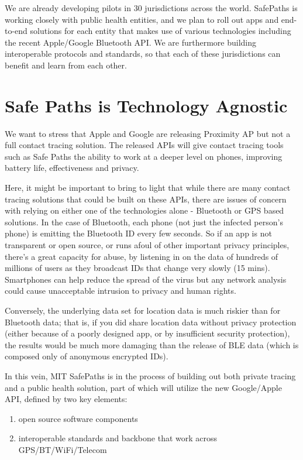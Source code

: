 \documentclass[11pt]{article}
\begin{document}
We are already developing pilots in 30 jurisdictions across the world.  SafePaths is working closely with public health entities, and we plan to roll out apps and end-to-end solutions for each entity that makes use of  various technologies including the recent Apple/Google Bluetooth API. We are furthermore building interoperable protocols and standards, so that each of these jurisdictions can benefit and learn from each other.


\section{Safe Paths is Technology Agnostic}


We want to stress that Apple and Google are releasing Proximity AP but not a full contact tracing solution. The released APIs will give contact tracing tools such as Safe Paths the ability to work at a deeper level on phones, improving battery life, effectiveness and privacy. 


Here, it might be important to bring to light that while there are many contact tracing solutions that could be built on these APIs, there are issues of concern with relying on either one of the technologies alone - Bluetooth or GPS based solutions. In the case of Bluetooth, each phone (not just the infected person's phone) is emitting the Bluetooth ID every few seconds. So if an app is not transparent or open source, or runs afoul of other important privacy principles, there’s a great capacity for abuse, by listening in on the data of hundreds of millions of users as they broadcast IDs that change very slowly (15 mins). Smartphones can help reduce the spread of the virus but any network analysis could cause unacceptable intrusion to privacy and human rights. 


Conversely, the underlying data set for location data is much riskier than for Bluetooth data; that is, if you did share location data without privacy protection (either because of a poorly designed app, or by insufficient security protection), the results would be much more damaging than the release of BLE data (which is composed only of anonymous encrypted IDs).


In this vein, MIT SafePaths is in the process of building out both private tracing and a public health solution, part of which will utilize the new Google/Apple API, defined by two key elements:
\begin{enumerate}
\item open source software components
\item interoperable standards and backbone that work across GPS/BT/WiFi/Telecom
\end{enumerate}
\end{document}
